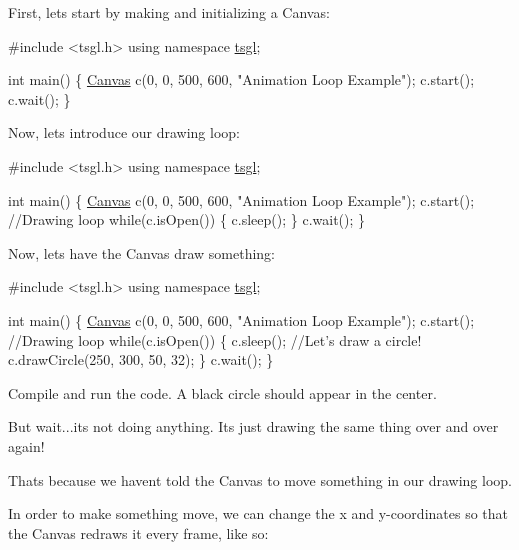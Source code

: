 First, let\textquotesingle{}s start by making and initializing a Canvas\+:


\begin{DoxyCode}
\textcolor{preprocessor}{#include <tsgl.h>}
\textcolor{keyword}{using namespace }\hyperlink{namespacetsgl}{tsgl};

\textcolor{keywordtype}{int} main() \{
  \hyperlink{classtsgl_1_1_canvas}{Canvas} c(0, 0, 500, 600, \textcolor{stringliteral}{"Animation Loop Example"});
  c.start();
  c.wait();
\}
\end{DoxyCode}


Now, let\textquotesingle{}s introduce our drawing loop\+:


\begin{DoxyCode}
\textcolor{preprocessor}{#include <tsgl.h>}
\textcolor{keyword}{using namespace }\hyperlink{namespacetsgl}{tsgl};

\textcolor{keywordtype}{int} main() \{
  \hyperlink{classtsgl_1_1_canvas}{Canvas} c(0, 0, 500, 600, \textcolor{stringliteral}{"Animation Loop Example"});
  c.start();
  \textcolor{comment}{//Drawing loop}
  \textcolor{keywordflow}{while}(c.isOpen()) \{
    c.sleep();
  \}
  c.wait();
\}
\end{DoxyCode}


Now, let\textquotesingle{}s have the Canvas draw something\+:


\begin{DoxyCode}
\textcolor{preprocessor}{#include <tsgl.h>}
\textcolor{keyword}{using namespace }\hyperlink{namespacetsgl}{tsgl};

\textcolor{keywordtype}{int} main() \{
  \hyperlink{classtsgl_1_1_canvas}{Canvas} c(0, 0, 500, 600, \textcolor{stringliteral}{"Animation Loop Example"});
  c.start();
  \textcolor{comment}{//Drawing loop}
  \textcolor{keywordflow}{while}(c.isOpen()) \{
    c.sleep();
    \textcolor{comment}{//Let's draw a circle!}
    c.drawCircle(250, 300, 50, 32);
  \}
  c.wait();
\}
\end{DoxyCode}


Compile and run the code. A black circle should appear in the center.

But wait...it\textquotesingle{}s not doing anything. It\textquotesingle{}s just drawing the same thing over and over again!

That\textquotesingle{}s because we haven\textquotesingle{}t told the Canvas to move something in our drawing loop.

In order to make something move, we can change the x and y-\/coordinates so that the Canvas redraws it every frame, like so\+:


